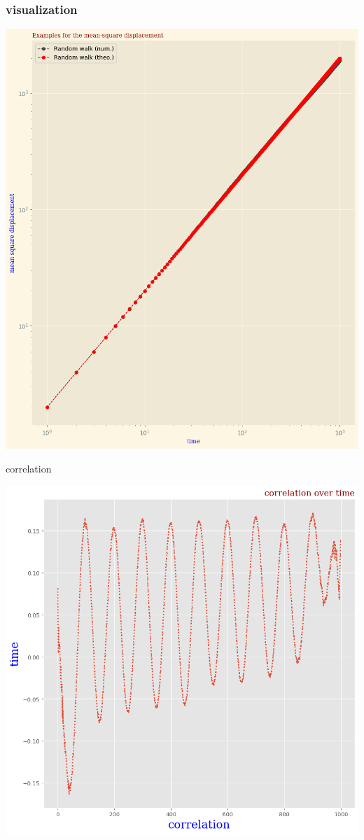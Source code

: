 \documentclass[12pt, a4paper, twoside]{report}
\begin{document}
    \subsubsection{visualization}

\begin{center}
    \centering
    \includegraphics[width=1.1\textwidth , height=.6\paperheight]{figure_msd.png}
    \caption{correlation}
\end{center}

\includegraphics{figure_correlation}
\end{document}
